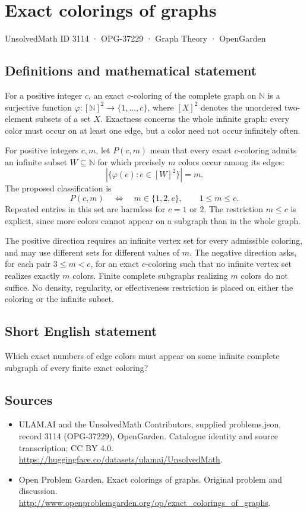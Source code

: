\documentclass[11pt,a4paper]{article}
\begin{document}
\section*{Exact colorings of graphs}\label{3114}
{\small UnsolvedMath ID 3114 · OPG-37229 · Graph Theory · OpenGarden}
\subsection{Definitions and mathematical statement}
For a positive integer $c$, an exact $c$-coloring of the complete graph on $\mathbb N$ is a surjective function $\varphi:[\mathbb N]^2\to\{1,\ldots,c\}$, where $[X]^2$ denotes the unordered two-element subsets of a set $X$. Exactness concerns the whole infinite graph: every color must occur on at least one edge, but a color need not occur infinitely often.

For positive integers $c,m$, let $P(c,m)$ mean that every exact $c$-coloring admits an infinite subset $W\subseteq\mathbb N$ for which precisely $m$ colors occur among its edges:
\[
 \left|\{\varphi(e):e\in[W]^2\}\right|=m.
\]
The proposed classification is
\[
 P(c,m)\quad\Longleftrightarrow\quad m\in\{1,2,c\},
 \qquad 1\le m\le c.
\]
Repeated entries in this set are harmless for $c=1$ or $2$. The restriction $m\le c$ is explicit, since more colors cannot appear on a subgraph than in the whole graph.

The positive direction requires an infinite vertex set for every admissible coloring, and may use different sets for different values of $m$. The negative direction asks, for each pair $3\le m<c$, for an exact $c$-coloring such that no infinite vertex set realizes exactly $m$ colors. Finite complete subgraphs realizing $m$ colors do not suffice. No density, regularity, or effectiveness restriction is placed on either the coloring or the infinite subset.
\subsection{Short English statement}
Which exact numbers of edge colors must appear on some infinite complete subgraph of every finite exact coloring?
\subsection{Sources}
\begin{itemize}
\item[S1] ULAM.AI and the UnsolvedMath Contributors, supplied problems.json, record 3114 (OPG-37229), OpenGarden. Catalogue identity and source transcription; CC BY 4.0.
\url{https://huggingface.co/datasets/ulamai/UnsolvedMath}.
\item[S2] Open Problem Garden, Exact colorings of graphs. Original problem and discussion.
\url{http://www.openproblemgarden.org/op/exact_colorings_of_graphs}.
\end{itemize}
\end{document}
